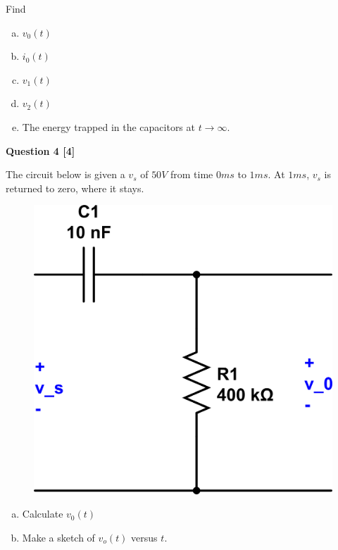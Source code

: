 \documentclass[12pt]{article}
\begin{document}
Find
\begin{enumerate}[(a)]
\item $v_0(t)$
\item $i_0(t)$
\item $v_1(t)$
\item $v_2(t)$
\item The energy trapped in the capacitors at $t \rightarrow \infty$.
\end{enumerate}



{\bf Question 4 [4]} %

The circuit below is given a $v_s$ of $50V$ from time $0ms$ to $1ms$. At $1ms$, $v_s$ is returned to zero, where it stays.

\begin{figure}[h!]
\begin{center}
 \includegraphics[scale=0.3]{p7_84.png}
\end{center}
\end{figure}

\begin{enumerate}[(a)]
\item Calculate $v_0(t)$
\item Make a sketch of $v_o(t)$ versus $t$.
\end{enumerate} 

\newpage
\end{document}
